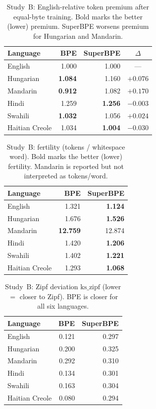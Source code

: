 \documentclass[11pt,a4paper]{article}
\begin{document}
\begin{table}[t]
\centering
\caption{Study~B: English-relative token premium after equal-byte training.
Bold marks the better (lower) premium. SuperBPE worsens premium for Hungarian and Mandarin.}
\label{tab:plan-a-premium}
\small
\begin{tabular}{@{}lrrc@{}}
\toprule
Language & BPE & SuperBPE & $\Delta$ \\
\midrule
English           & 1.000 & 1.000 & --- \\
Hungarian         & \textbf{1.084} & 1.160 & $+0.076$ \\
Mandarin          & \textbf{0.912} & 1.082 & $+0.170$ \\
Hindi             & 1.259 & \textbf{1.256} & $-0.003$ \\
Swahili           & \textbf{1.032} & 1.056 & $+0.024$ \\
Haitian Creole    & 1.034 & \textbf{1.004} & $-0.030$ \\
\bottomrule
\end{tabular}
\end{table}

\begin{table}[t]
\centering
\caption{Study~B: fertility (tokens / whitespace word). Bold marks the better (lower) fertility.
Mandarin is reported but not interpreted as tokens/word.}
\label{tab:plan-a-fertility}
\small
\begin{tabular}{@{}lrr@{}}
\toprule
Language & BPE & SuperBPE \\
\midrule
English        & 1.321 & \textbf{1.124} \\
Hungarian      & 1.676 & \textbf{1.526} \\
Mandarin       & \textbf{12.759} & 12.874 \\
Hindi          & 1.420 & \textbf{1.206} \\
Swahili        & 1.402 & \textbf{1.221} \\
Haitian Creole & 1.293 & \textbf{1.068} \\
\bottomrule
\end{tabular}
\end{table}

\begin{table}[t]
\centering
\caption{Study~B: Zipf deviation $\mathrm{ks\_zipf}$ (lower $=$ closer to Zipf). BPE is closer for all six languages.}
\label{tab:plan-a-zipf}
\small
\begin{tabular}{@{}lrr@{}}
\toprule
Language & BPE & SuperBPE \\
\midrule
English        & 0.121 & 0.297 \\
Hungarian      & 0.200 & 0.325 \\
Mandarin       & 0.292 & 0.310 \\
Hindi          & 0.134 & 0.301 \\
Swahili        & 0.163 & 0.304 \\
Haitian Creole & 0.080 & 0.294 \\
\bottomrule
\end{tabular}
\end{table}
\end{document}
